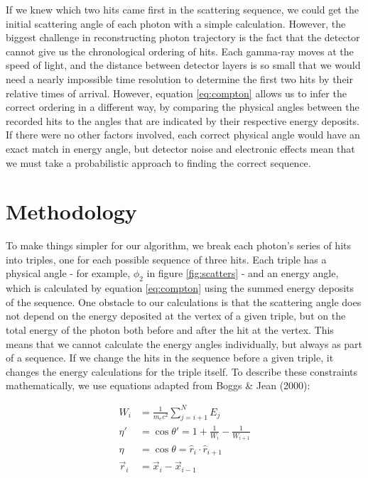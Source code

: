 If we knew which two hits came first in the scattering sequence, we could get the initial scattering angle of each photon with a simple calculation. However, the biggest challenge in reconstructing photon trajectory is the fact that the detector cannot give us the chronological ordering of hits. Each gamma-ray moves at the speed of light, and the distance between detector layers is so small that we would need a nearly impossible time resolution to determine the first two hits by their relative times of arrival. However, equation \ref{eq:compton} allows us to infer the correct ordering in a different way, by comparing the physical angles between the recorded hits to the angles that are indicated by their respective energy deposits. If there were no other factors involved, each correct physical angle would have an exact match in energy angle, but detector noise and electronic effects mean that we must take a probabilistic approach to finding the correct sequence.

\section{Methodology}
To make things simpler for our algorithm, we break each photon's series of hits into triples, one for each possible sequence of three hits. Each triple has a physical angle - for example, $\phi_2$ in figure \ref{fig:scatters} - and an energy angle, which is calculated by equation \ref{eq:compton} using the summed energy deposits of the sequence. One obstacle to our calculations is that the scattering angle does not depend on the energy deposited at the vertex of a given triple, but on the total energy of the photon both before and after the hit at the vertex. This means that we cannot calculate the energy angles individually, but always as part of a sequence. If we change the hits in the sequence before a given triple, it changes the energy calculations for the triple itself. To describe these constraints mathematically, we use equations adapted from Boggs \& Jean (2000)\cite{Boggs}:

\begin{align}
    W_i &= \frac{1}{m_ec^2}\sum_{j=i+1}^N E_j\\
    \label{eq:new_compton}\eta' &= \cos\theta' = 1+\frac{1}{W_i}-\frac{1}{W_{i+1}}\\
    \eta &= \cos\theta = \hat{r}_i \cdot \hat{r}_{i+1}\\
    \vec{r}_i &= \vec{x}_i - \vec{x}_{i-1}
\end{align}


